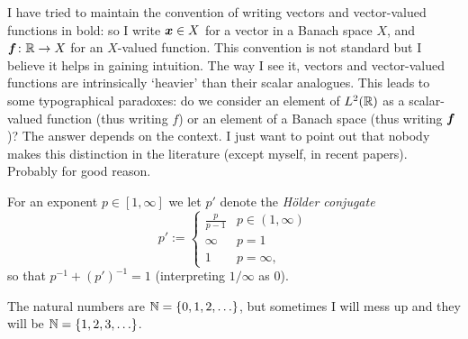 I have tried to maintain the convention of writing vectors and vector-valued functions in bold: so I write $\bm{x} \in X$ for a vector in a Banach space $X$, and $\bm{f} \colon \mathbb{R} \rightarrow X$ for an $X$-valued function.
This convention is not standard but I believe it helps in gaining intuition.
The way I see it, vectors and vector-valued functions are intrinsically `heavier' than their scalar analogues.
This leads to some typographical paradoxes: do we consider an element of $L^2(\mathbb{R})$ as a scalar-valued function (thus writing $f$) or an element of a Banach space (thus writing $\bm{f}$)?
The answer depends on the context.
I just want to point out that nobody makes this distinction in the literature (except myself, in recent papers).
Probably for good reason.


For an exponent $p \in [1,\infty]$ we let $p'$ denote the \emph{H\"older conjugate}
\begin{equation*}
  p' := \begin{cases}
    \frac{p}{p-1} & p \in (1,\infty) \\
    \infty & p = 1 \\
    1 & p = \infty,
  \end{cases}
\end{equation*}
so that $p^{-1} + (p')^{-1} = 1$ (interpreting $1/\infty$ as $0$).

The natural numbers are $\mathbb{N} = \{0,1,2,\ldots\}$, but sometimes I will mess up and they will be $\mathbb{N} = \{1,2,3,\ldots\}$.





